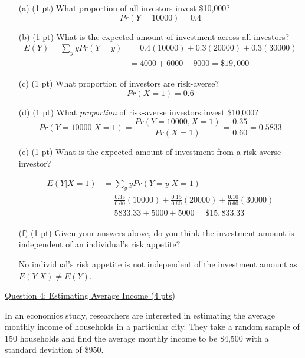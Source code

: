 \documentclass{./../../Latex/tests}
\begin{document}
\begin{enumerate}
\item[(a)] (1 pt) What proportion of all investors invest \$10,000?
$$ Pr(Y=10000) = 0.4  $$
\item[(b)] (1 pt) What is the expected amount of investment across all investors?
\begin{align*}
	E(Y) = \sum_y y Pr(Y=y) &= 0.4(10000) + 0.3(20000) + 0.3(30000) \\
	& = 4000 + 6000 + 9000 = \$ 19,000
\end{align*}

\item[(c)] (1 pt) What proportion of investors are risk-averse?
$$ Pr(X = 1) = 0.6 $$

\newpage
\item[(d)] (1 pt) What \textit{proportion} of risk-averse investors invest \$10,000?
$$ Pr(Y=10000|X=1) = \frac{Pr(Y=10000, X=1)}{Pr(X=1)} = \frac{0.35}{0.60} = 0.5833 $$

\item[(e)] (1 pt) What is the expected amount of investment from a risk-averse investor?

\begin{align*}
	E(Y|X=1) &= \sum_y y Pr(Y=y|X=1) \\
	&= \frac{0.35}{0.60}(10000) + \frac{0.15}{0.60}(20000) + \frac{0.10}{0.60}(30000) \\
	& = 5833.33 + 5000 + 5000 = \$ 15,833.33
\end{align*}
  
\item[(f)] (1 pt) Given your answers above, do you think the investment amount is independent of an individual's risk appetite?

No individual's risk appetite is not independent of the investment amount as $E(Y|X) \neq E(Y)$.
\end{enumerate}

\newpage
\underline{Question 4: Estimating Average Income (4 pts)}

In an economics study, researchers are interested in estimating the average monthly income of households in a particular city. They take a random sample of 150 households and find the average monthly income to be \$4,500 with a standard deviation of \$950.
\end{document}

